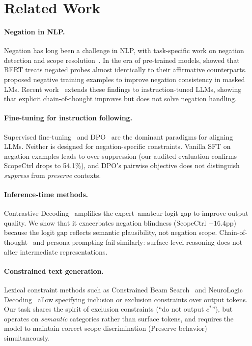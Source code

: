 \documentclass[letterpaper]{article}
\begin{document}
\section{Related Work}
\label{sec:related}

\paragraph{Negation in NLP.}
Negation has long been a challenge in NLP, with task-specific work on
negation detection and scope resolution~\cite{hossain2020analysis}.
In the era of pre-trained models, \citet{kassner2020negated} showed that BERT
treats negated probes almost identically to their affirmative counterparts.
\citet{hosseini2021understanding} proposed negative training examples to
improve negation consistency in masked LMs.
Recent work~\cite{nos2024negation,truong2023unsee} extends these findings to
instruction-tuned LLMs, showing that explicit chain-of-thought improves but
does not solve negation handling.

\paragraph{Fine-tuning for instruction following.}
Supervised fine-tuning~\cite{ouyang2022training} and DPO~\cite{rafailov2023direct}
are the dominant paradigms for aligning LLMs.
Neither is designed for negation-specific constraints.
Vanilla SFT on negation examples leads to over-suppression
(our audited evaluation confirms ScopeCtrl drops to 54.1\%), and DPO's
pairwise objective does not distinguish \emph{suppress} from \emph{preserve} contexts.

\paragraph{Inference-time methods.}
Contrastive Decoding~\cite{li2023contrastive} amplifies the expert--amateur
logit gap to improve output quality.
We show that it exacerbates negation blindness (ScopeCtrl $-16.4$pp)
because the logit gap reflects semantic plausibility, not negation scope.
Chain-of-thought~\cite{wang2022self} and persona prompting fail similarly:
surface-level reasoning does not alter intermediate representations.

\paragraph{Constrained text generation.}
Lexical constraint methods such as Constrained Beam Search~\cite{anderson2017guided}
and NeuroLogic Decoding~\cite{lu2021neurologic} allow specifying inclusion or
exclusion constraints over output tokens.
Our task shares the spirit of exclusion constraints (``do not output $c^*$''),
but operates on \emph{semantic} categories rather than surface tokens, and requires
the model to maintain correct scope discrimination (Preserve behavior) simultaneously.
\end{document}

